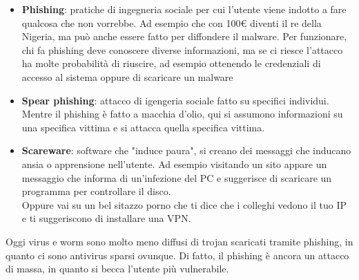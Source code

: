 \documentclass[12pt, oneside]{extbook}
\begin{document}
\begin{itemize}
\item \textbf{Phishing}: pratiche di ingegneria sociale per cui l'utente viene indotto a fare qualcosa che non vorrebbe. Ad esempio che con 100€ diventi il re della Nigeria, ma può anche essere fatto per diffondere il malware. Per funzionare, chi fa phishing deve conoscere diverse informazioni, ma se ci riesce l'attacco ha molte probabilità di riuscire, ad esempio ottenendo le credenziali di accesso al sistema oppure di scaricare un malware
\item \textbf{Spear phishing}: attacco di igengeria sociale fatto su specifici individui. Mentre il phishing è fatto a macchia d'olio, qui si assumono informazioni su una specifica vittima e si attacca quella specifica vittima.
\item \textbf{Scareware}: software che "induce paura", si creano dei messaggi che inducano ansia o apprensione nell'utente. Ad esempio visitando un sito appare un messaggio che informa di un'infezione del PC e suggerisce di scaricare un programma per controllare il disco.\\Oppure vai su un bel sitazzo porno che ti dice che i colleghi vedono il tuo IP e ti suggeriscono di installare una VPN.
\end{itemize}
Oggi virus e worm sono molto meno diffusi di trojan scaricati tramite phishing, in quanto ci sono antivirus sparsi ovunque. Di fatto, il phishing è ancora un attacco di massa, in quanto si becca l'utente più vulnerabile.
\end{document}
